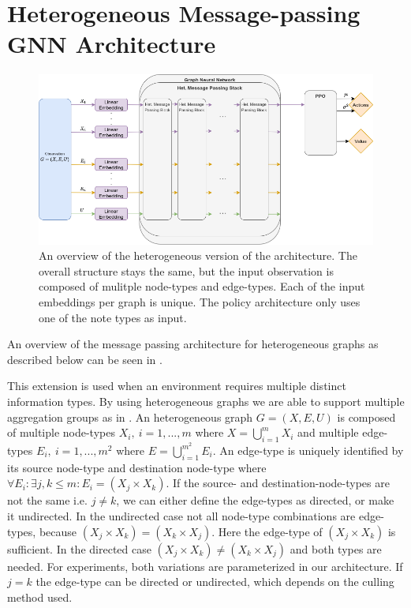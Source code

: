 \section{Heterogeneous Message-passing GNN Architecture}
\begin{figure}[htp]
    \centering
    \includegraphics[width=1.0\textwidth]{figures/heterogeneous_gnn.png}
    \hspace{1cm}   
    \caption{An overview of the heterogeneous version of the architecture. The overall structure stays the same, but the input observation is composed of mulitple node-types and edge-types. Each of the input embeddings per graph is unique. The policy architecture only uses one of the note types as input.}
    \label{fig:heterogeneous_gnn}
\end{figure}

An overview of the message passing architecture for heterogeneous graphs as described below can be seen in .

This extension is used when an environment requires multiple distinct information types. By using heterogeneous graphs we are able to support multiple aggregation groups as in . An heterogeneous graph $G = (X, E, U)$ is composed of multiple node-types $X_i,\ i = 1,...,m$ where $X = \bigcup_{i=1}^m X_i$ and multiple edge-types $E_i,\ i = 1,...,m^2$ where $E = \bigcup_{i=1}^{m^2} E_i$. An edge-type is uniquely identified by its source node-type and destination node-type where $\forall E_i: \exists j,k \leq m: E_i = (X_j \times X_k)$. If the source- and destination-node-types are not the same i.e. $j \neq k$, we can either define the edge-types as directed, or make it undirected. In the undirected case not all node-type combinations are edge-types, because $(X_j \times X_k) = (X_k \times X_j)$. Here the edge-type of $(X_j \times X_k)$ is sufficient. In the directed case $(X_j \times X_k) \neq (X_k \times X_j)$ and both types are needed. For experiments, both variations are parameterized in our architecture. If $j = k$ the edge-type can be directed or undirected, which depends on the culling method used. \par

